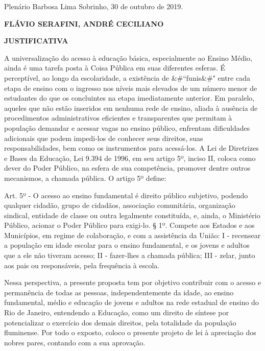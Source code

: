 \documentclass[10pt]{article}
\begin{document}
\begin{center}
  Plenário Barbosa Lima Sobrinho, 30 de outubro de 2019.

   \bigskip

  \textbf{ FLÁVIO SERAFINI, ANDRÉ CECILIANO}

  \bigskip

  \textbf{JUSTIFICATIVA}
  \bigskip

\end{center}

  A universalização do acesso à educação básica, especialmente ao Ensino Médio, ainda é uma tarefa posta à Coisa Pública em suas diferentes esferas. É perceptível, ao longo da escolaridade, a existência de &#``funis&#" entre cada etapa de ensino com o ingresso nos níveis mais elevados de um número menor de estudantes do que os concluintes na etapa imediatamente anterior.
Em paralelo, aqueles que não estão inseridos em nenhuma rede de ensino, aliada à ausência de procedimentos administrativos eficientes e transparentes que permitam à população demandar e acessar vagas no ensino público, enfrentam dificuldades adicionais que podem impedi-los de conhecer seus direitos, suas responsabilidades, bem como os instrumentos para acessá-los.
A Lei de Diretrizes e Bases da Educação, Lei 9.394 de 1996, em seu artigo 5º, inciso II, coloca como dever do Poder Público, na esfera de sua competência, promover dentre outros mecanismos, a chamada pública. 
 O artigo 5º define:

		Art. 5º - O acesso ao ensino fundamental é direito público subjetivo, podendo qualquer cidadão, grupo de cidadãos, associação comunitária, organização sindical, entidade de classe ou outra legalmente constituída, e, ainda, o Ministério Público, acionar o Poder 			Público para exigi-lo.
		§ 1º. Compete aos Estados e aos Municípios, em regime de colaboração, e com a assistência da União:
		I - recensear a população em idade escolar para o ensino fundamental, e os jovens e adultos que a ele não tiveram acesso;
		II - fazer-lhes a chamada pública;
		III - zelar, junto aos pais ou responsáveis, pela frequência à escola.

Nessa perspectiva, a presente proposta tem por objetivo contribuir com o acesso e permanência de todas as pessoas, independentemente da idade, ao ensino fundamental, médio e educação de jovens e adultos na rede estadual de ensino do Rio de Janeiro, entendendo a Educação, como um direito de síntese por potencializar o exercício dos demais direitos, pela totalidade da população fluminense.
Por todo o exposto, coloco o presente projeto de lei à apreciação dos nobres pares, contando com a sua aprovação.



\iffalse
\begin{center}
  \textbf{REFERÊNCIAS}
\end{center}


\fi
\end{document}
